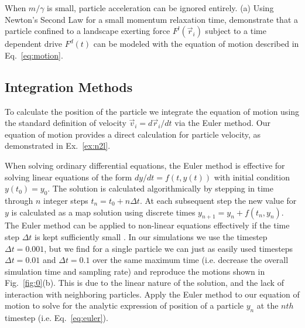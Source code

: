 \documentclass[twocolumn,preprintnumbers,amsmath,amssymb,aps,prx]{revtex4}
\begin{document}
  When $m/\gamma$ is small,
  particle acceleration can be ignored
  entirely.
  (a) Using Newton's Second Law for
  a small momentum relaxation time, 
  demonstrate that a particle confined to a landscape exerting force
  $F^l(\vec{r}_i)$ subject to a time dependent drive $F^d(t)$
  can be modeled with the equation of motion described in 
  Eq.~\ref{eq:motion}. 


  \subsection{Integration Methods}
  \label{ex:euler}
    To calculate the position of the particle we
    integrate the equation of motion using
    the standard definition of velocity
    $\vec{v}_i = d\vec{r}_i/dt$ 
    via the 
    Euler method. %
    Our equation of motion provides
    a direct calculation for particle velocity,
    as demonstrated in Ex.~\ref{ex:n2l}.  
    
  When solving ordinary differential equations,
  the Euler method is effective for solving linear equations
  of the form
  $dy/dt = f(t,y(t))$ with initial condition $y(t_0) = y_0$.
  The solution is calculated algorithmically
  by stepping in time through $n$ integer steps
  $t_n = t_0 + n \Delta t$.
  At each subsequent step the new
  value for $y$ is calculated as a map solution using
  discrete times 
  $y_{n+1} = y_n + f(t_n,y_n)$.
  The Euler method can be applied to non-linear
  equations effectively if the time step $\Delta t$
  is kept sufficiently small \cite{Newman}.
  In our simulations we use the timestep $\Delta t = 0.001$,
  but we find for a single particle
  we can just as easily used 
  timesteps $\Delta t = 0.01$ and $\Delta t = 0.1$
  over the same maximum time
  (i.e. decrease the overall simulation time and sampling rate)
  and reproduce the motions shown in Fig.~\ref{fig:0}(b).
  This is due to the linear nature of the solution,
  and the lack of interaction with neighboring particles.
  Apply the Euler method to our equation
  of motion to solve for the analytic expression
  of position of a particle
  $y_n$ at the $nth$ timestep (i.e. Eq.~\ref{eq:euler}).
\end{document}
